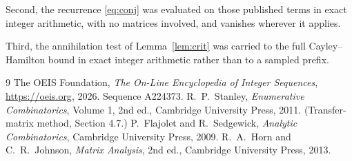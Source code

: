 \documentclass[11pt,a4paper]{article}
\theoremstyle{plain}
\theoremstyle{definition}
\begin{document}
Second, the recurrence \eqref{eq:conj} was evaluated on those published terms in exact
integer arithmetic, with no matrices involved, and vanishes wherever it applies.

Third, the annihilation test of Lemma~\ref{lem:crit} was carried to the full
Cayley--Hamilton bound in exact integer arithmetic rather than to a sampled prefix.

\begin{thebibliography}{9}
 The OEIS Foundation, \emph{The On-Line Encyclopedia of Integer
Sequences}, \url{https://oeis.org}, 2026. Sequence A224373.
 R.~P.~Stanley, \emph{Enumerative Combinatorics}, Volume 1, 2nd ed.,
Cambridge University Press, 2011. (Transfer-matrix method, Section 4.7.)
 P.~Flajolet and R.~Sedgewick, \emph{Analytic Combinatorics}, Cambridge
University Press, 2009.
 R.~A.~Horn and C.~R.~Johnson, \emph{Matrix Analysis}, 2nd ed., Cambridge
University Press, 2013.
\end{thebibliography}
\end{document}
